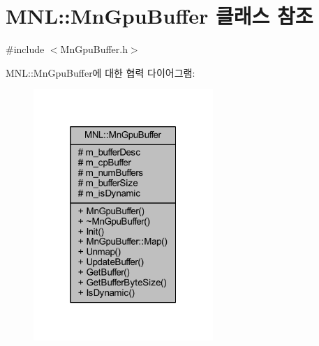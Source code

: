 \hypertarget{class_m_n_l_1_1_mn_gpu_buffer}{}\section{M\+NL\+:\+:Mn\+Gpu\+Buffer 클래스 참조}
\label{class_m_n_l_1_1_mn_gpu_buffer}


{\ttfamily \#include $<$Mn\+Gpu\+Buffer.\+h$>$}



M\+NL\+:\+:Mn\+Gpu\+Buffer에 대한 협력 다이어그램\+:\nopagebreak
\begin{figure}[H]
\begin{center}
\leavevmode
\includegraphics[width=193pt]{class_m_n_l_1_1_mn_gpu_buffer__coll__graph}
\end{center}
\end{figure}
